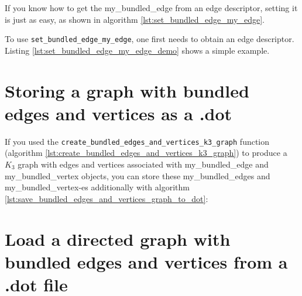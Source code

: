 If you know how to get the my\_bundled\_edge from an edge descriptor, 
setting it is just as easy, as shown in algorithm \ref{lst:set_bundled_edge_my_edge}.



To use \verb;set_bundled_edge_my_edge;, 
one first needs to obtain an edge descriptor.
Listing \ref{lst:set_bundled_edge_my_edge_demo}
shows a simple example.



\section{Storing a graph with bundled edges and vertices as a .dot}
\label{subsec:save_bundled_edges_and_vertices_graph_to_dot}

If you used the \verb;create_bundled_edges_and_vertices_k3_graph; 
function (algorithm \ref{lst:create_bundled_edges_and_vertices_k3_graph}) 
to produce a $K_{3}$ graph with edges and vertices 
associated with my\_bundled\_edge and my\_bundled\_vertex objects, 
you can store these my\_bundled\_edges and my\_bundled\_vertex-es
additionally with algorithm \ref{lst:save_bundled_edges_and_vertices_graph_to_dot}:



\section{Load a directed graph with bundled edges and vertices from a .dot file}
\label{subsec:sub:load_directed_bundled_edges_and_vertices_graph_from_dot}

